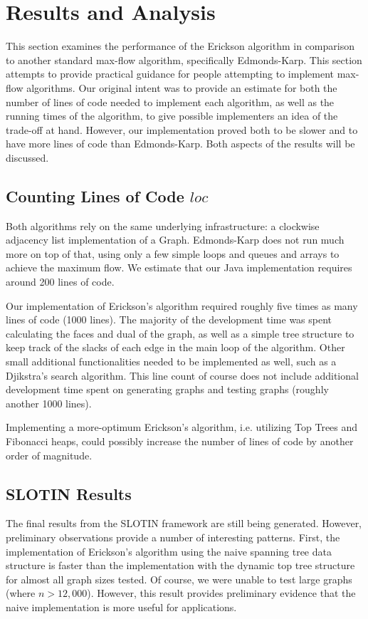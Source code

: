 \documentclass[12pt]{article}
\begin{document}
\section{Results and Analysis}

This section examines the performance of the Erickson algorithm in comparison to another standard max-flow algorithm, specifically Edmonds-Karp. This section attempts to provide practical guidance for people attempting to implement max-flow algorithms.  Our original intent was to provide an estimate for both the number of lines of code needed to implement each algorithm, as well as the running times of the algorithm, to give possible implementers an idea of the trade-off at hand.  However, our implementation proved both to be slower and to have more lines of code than Edmonds-Karp.  Both aspects of the results will be discussed.

\subsection{Counting Lines of Code $loc$}

Both algorithms rely on the same underlying infrastructure: a clockwise adjacency list implementation of a Graph.  Edmonds-Karp does not run much more on top of that, using only a few simple loops and queues and arrays to achieve the maximum flow.  We estimate that our Java implementation requires around 200 lines of code.

Our implementation of Erickson's algorithm required roughly five times as many lines of code (1000 lines).  The majority of the development time was spent calculating the faces and dual of the graph, as well as a simple tree structure to keep track of the slacks of each edge in the main loop of the algorithm.  Other small additional functionalities needed to be implemented as well, such as a Djikstra's search algorithm.  This line count of course does not include additional development time spent on generating graphs and testing graphs (roughly another 1000 lines).

Implementing a more-optimum Erickson's algorithm, i.e. utilizing Top Trees and Fibonacci heaps, could possibly increase the number of lines of code by another order of magnitude.

\subsection{SLOTIN Results}

The final results from the SLOTIN framework are still being generated. However, preliminary observations provide a number of interesting patterns. First, the implementation of Erickson's algorithm using the naive spanning tree data structure is faster than the implementation with the dynamic top tree structure for almost all graph sizes tested. Of course, we were unable to test large graphs (where $n > 12,000$). However, this result provides preliminary evidence that the naive implementation is more useful for applications. 
\end{document}
